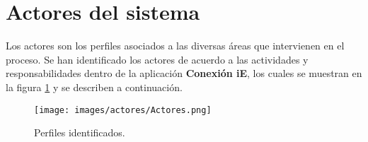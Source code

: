 \section{Actores del sistema}\label{sec:Comportamiento:ActoresSistema}

Los actores son los perfiles asociados a las diversas áreas que intervienen en el proceso. Se han identificado los actores de acuerdo a las actividades y responsabilidades dentro de la aplicación \textbf{Conexión iE}, los cuales se muestran en la figura \ref{fig:perfilesPAEAR} y se describen a continuación.


    \begin{figure}[h!]
      \begin{center}
	  \texttt{[image: images/actores/Actores.png]}
      \caption{Perfiles identificados.}
      \label{fig:perfilesPAEAR}
      \end{center}
    \end{figure}

